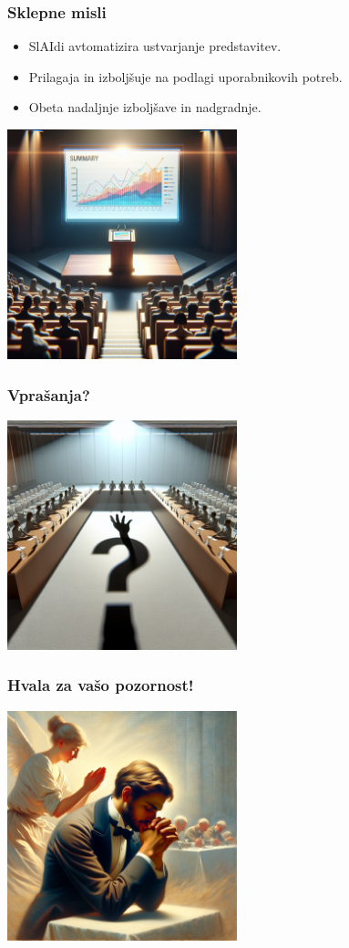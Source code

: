 \documentclass{beamer}
\begin{document}
\begin{frame}
\frametitle{Sklepne misli}
\begin{itemize}
    \item SlAIdi avtomatizira ustvarjanje predstavitev.
    \item Prilagaja in izboljšuje na podlagi uporabnikovih potreb.
    \item Obeta nadaljnje izboljšave in nadgradnje.
\end{itemize}
\centering
\includegraphics[width=0.5\textwidth]{./images/conclusion.png}
\end{frame}

\begin{frame}
\frametitle{Vprašanja?}
\centering
\includegraphics[width=0.5\textwidth]{./images/questions.png}
\end{frame}

\begin{frame}
\frametitle{Hvala za vašo pozornost!}
\centering
\includegraphics[width=0.5\textwidth]{./images/thankyou.png}
\end{frame}
\end{document}
